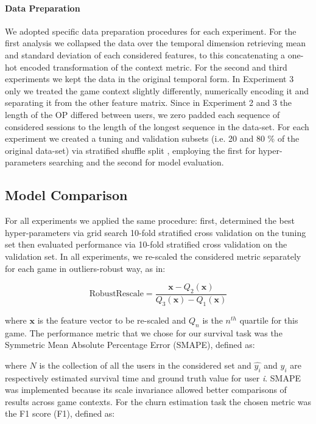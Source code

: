 \paragraph*{Data Preparation}We adopted specific data preparation procedures for each experiment. For the first analysis we collapsed the data over the temporal dimension retrieving mean and standard deviation of each considered features, to this concatenating a one-hot encoded transformation of the context metric. For the second and third experiments we kept the data in the original temporal form. In Experiment 3 only we treated the game context slightly differently, numerically encoding it and separating it from the other feature matrix. Since in Experiment 2 and 3 the length of the OP differed between users, we zero padded each sequence of considered sessions to the length of the longest sequence in the data-set. For each experiment we created a tuning and validation subsets (i.e. 20 and 80 \% of the original data-set) via stratified shuffle split \cite{scikit-learn}, employing the first for hyper-parameters searching and the second for model evaluation.

\subsection{Model Comparison}
For all experiments we applied the same procedure: first, determined the best hyper-parameters via grid search 10-fold stratified cross validation \cite{scikit-learn} on the tuning set then evaluated performance via 10-fold stratified cross validation on the validation set. In all experiments, we re-scaled the considered metric separately for each game in outliers-robust way, as in:

\begin{equation}
\label{robustscaler}
    \text{RobustRescale}=
        \dfrac
            {\mathbf{x} - Q_2(\mathbf{x})}
            {Q_3(\mathbf{x}) - Q_1(\mathbf{x})}
\end{equation}

where $\mathbf{x}$ is the feature vector to be re-scaled and $Q_n$ is the $n^{th}$ quartile for this game. The performance metric that we chose for our survival task was the Symmetric Mean Absolute Percentage Error (SMAPE), defined as:



where $N$ is the collection of all the users in the considered set and $\hat{y_i}$ and $y_i$ are respectively estimated survival time and ground truth value for user \textit{i}. SMAPE was implemented because its scale invariance allowed better comparisons of results across game contexts. For the churn estimation task the chosen metric was the F1 score (F1), defined as:

